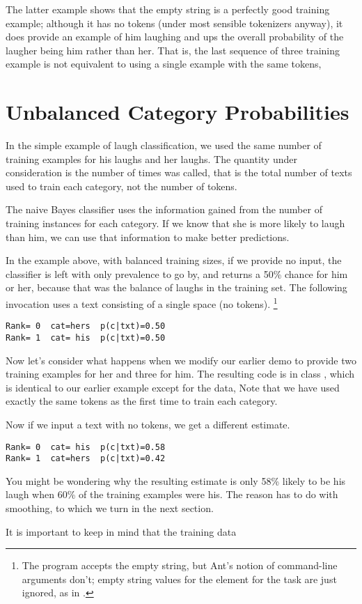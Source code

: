 The latter example shows that the empty string is a perfectly good
training example; although it has no tokens (under most sensible
tokenizers anyway), it does provide an example of him laughing and ups
the overall probability of the laugher being him rather than her.
That is, the last sequence of three training example is not equivalent to
using a single example with the same tokens,
%



\section{Unbalanced Category Probabilities}

In the simple example of laugh classification, we used the same number
of training examples for his laughs and her laughs.  The quantity
under consideration is the number of times  was
called, that is the total number of texts used to train each category,
not the number of tokens.

The naive Bayes classifier uses the information gained from the number
of training instances for each category.  If we know that she is more
likely to laugh than him, we can use that information to make better
predictions.  

In the example above, with balanced training sizes, if we provide no
input, the classifier is left with only prevalence to go by, and
returns a 50\% chance for him or her, because that was the balance of
laughs in the training set.  The following invocation uses a text
consisting of a single space (no tokens).%
%
\footnote{The program accepts the empty string, but Ant's notion of
  command-line arguments don't; empty string values for the 
  element for the  task are just ignored, as in
  .}
%
\begin{verbatim}
Rank= 0  cat=hers  p(c|txt)=0.50
Rank= 1  cat= his  p(c|txt)=0.50
\end{verbatim}
%

Now let's consider what happens when we modify our earlier demo
to provide two training examples for her and three for him.  The
resulting code is in class , which is identical
to our earlier example except for the data,
%
%
%
Note that we have used exactly the same tokens as the first
time to train each category.  


Now if we input a text with no tokens, we get a different estimate.
%
\begin{verbatim}
Rank= 0  cat= his  p(c|txt)=0.58
Rank= 1  cat=hers  p(c|txt)=0.42
\end{verbatim}
%
You might be wondering why the resulting estimate is only 58\% likely
to be his laugh when 60\% of the training examples were his.  The
reason has to do with smoothing, to which we turn in the next section.

It is important to keep in mind that the training data









